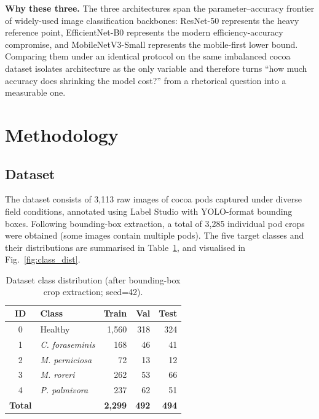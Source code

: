 \documentclass[conference,10pt]{IEEEtran}
\begin{document}
\textbf{Why these three.} The three architectures span the
parameter--accuracy frontier of widely-used image classification backbones:
ResNet-50 represents the heavy reference point, EfficientNet-B0 represents
the modern efficiency-accuracy compromise, and MobileNetV3-Small represents
the mobile-first lower bound. Comparing them under an identical protocol on
the same imbalanced cocoa dataset isolates architecture as the only variable
and therefore turns ``how much accuracy does shrinking the model cost?''
from a rhetorical question into a measurable one.

\section{Methodology}\label{sec:method}

\subsection{Dataset}

The dataset consists of 3{,}113 raw images of cocoa pods captured under
diverse field conditions, annotated using Label Studio with YOLO-format
bounding boxes. Following bounding-box extraction, a total of 3{,}285
individual pod crops were obtained (some images contain multiple pods). The
five target classes and their distributions are summarised in
Table~\ref{tab:dataset}, and visualised in Fig.~\ref{fig:class_dist}.

\begin{table}[t]
\centering
\caption{Dataset class distribution (after bounding-box crop extraction; seed=42).}
\label{tab:dataset}
\renewcommand{\arraystretch}{1.15}
\begin{tabular}{clrrr}
\toprule
\textbf{ID} & \textbf{Class} & \textbf{Train} & \textbf{Val} & \textbf{Test} \\
\midrule
0 & Healthy                    & 1{,}560 & 318 & 324 \\
1 & \textit{C. foraseminis}    &   168   &  46 &  41 \\
2 & \textit{M. perniciosa}     &    72   &  13 &  12 \\
3 & \textit{M. roreri}         &   262   &  53 &  66 \\
4 & \textit{P. palmivora}      &   237   &  62 &  51 \\
\midrule
\textbf{Total} & & \textbf{2{,}299} & \textbf{492} & \textbf{494} \\
\bottomrule
\end{tabular}
\end{table}
\end{document}
